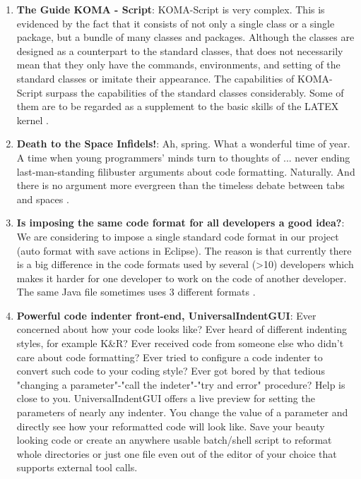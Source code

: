 \begin{englishtext}
\begin{enumerate}
    \item \textbf{The Guide KOMA - Script}: KOMA-Script  is very complex. This
    is evidenced by the fact that it consists of not only a single class or a
    single package, but a bundle of many classes and packages. Although the
    classes are designed as a counterpart to the standard classes, that does not
    necessarily mean that they only have the commands, environments, and setting
    of the standard classes or imitate their appearance. The capabilities of
    KOMA-Script surpass the capabilities of the standard classes considerably.
    Some of them are to be regarded as a supplement to the basic skills of the
    LATEX kernel \cite{komaScrguien}.

    \item \textbf{Death to the Space Infidels!}: Ah, spring. What a wonderful time of
    year. A time when young programmers' minds turn to thoughts of ... never
    ending last-man-standing filibuster arguments about code formatting.
    Naturally. And there is no argument more evergreen than the timeless debate
    between tabs and spaces \cite{Atwood}.

    \item \textbf{Is imposing the same code format for all developers a good
    idea?}: We are considering to impose a single standard code format in our
    project (auto format with save actions in Eclipse). The reason is that
    currently there is a big difference in the code formats used by several
    (>10) developers which makes it harder for one developer to work on the code
    of another developer. The same Java file sometimes uses 3 different formats
    \cite{Geukens}.

    \item \textbf{Powerful code indenter front-end, UniversalIndentGUI}: Ever
    concerned about how your code looks like? Ever heard of different indenting
    styles, for example K\&R? Ever received code from someone else who didn't
    care about code formatting? Ever tried to configure a code indenter to
    convert such code to your coding style? Ever got bored by that tedious
    "changing a parameter"-"call the indeter"-"try and error" procedure? Help is
    close to you. UniversalIndentGUI offers a live preview for setting the
    parameters of nearly any indenter. You change the value of a parameter and
    directly see how your reformatted code will look like. Save your beauty
    looking code or create an anywhere usable batch/shell script to reformat
    whole directories or just one file even out of the editor of your choice
    that supports external tool calls.


\end{enumerate}
\end{englishtext}
